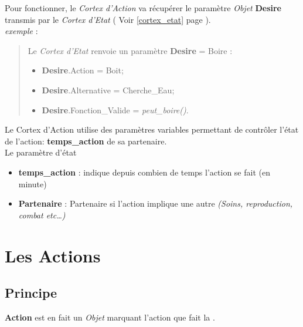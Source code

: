 \documentclass[french]{report}
\begin{document}
Pour fonctionner, le \textit{Cortex d'Action} va récupérer le paramètre \textit{Objet}  \textbf{Desire} transmis par le \textit{Cortex d'Etat} ( Voir \ref{cortex_etat} page \pageref{cortex_etat}).\\

\textit{exemple} : \\
\begin{quote}
	
	Le \textit{Cortex d'Etat} renvoie un paramètre \textbf{Desire} = Boire : \\
	
	\begin{itemize}
		\item \textbf{Desire}.Action = Boit;
		\item \textbf{Desire}.Alternative = Cherche\_Eau;
		\item \textbf{Desire}.Fonction\_Valide = \textit{peut\_boire()}.\\
	\end{itemize}
	
\end{quote}
Le Cortex d'Action utilise des paramètres variables permettant de contrôler l'état de l'action:
\textbf{temps\_action} de sa partenaire.\\
Le paramètre d'état  
\begin{itemize}
	\item \textbf{temps\_action} : indique depuis combien de temps l'action se fait (en minute)
	\item \textbf{Partenaire} : Partenaire si l'action implique une autre \CoCiX \textit{(Soins, reproduction, combat etc\dots)}
\end{itemize}
\section{Les Actions}\label{action}
\subsection{Principe}
\textbf{Action} est en fait un \textit{Objet} marquant l'action que fait la \CoCiX.\\
\end{document}
